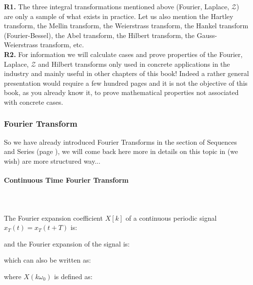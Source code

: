 	\begin{tcolorbox}[title=Remarks,arc=10pt,breakable,drop lifted shadow,
  skin=enhanced,
  skin first is subskin of={enhancedfirst}{arc=10pt,no shadow},
  skin middle is subskin of={enhancedmiddle}{arc=10pt,no shadow},
  skin last is subskin of={enhancedlast}{drop lifted shadow}]
	\textbf{R1.} The three integral transformations mentioned above (Fourier, Laplace, $\mathcal{Z}$) are only a sample of what exists in practice. Let us also mention the Hartley transform, the Mellin transform, the Weierstrass transform, the Hankel transform (Fourier-Bessel), the Abel transform, the Hilbert transform, the Gauss-Weierstrass transform, etc.\\
	
	\textbf{R2.} For information we will calculate cases and prove properties of the Fourier, Laplace, $\mathcal{Z}$ and Hilbert transforms only used in concrete applications in the industry and mainly useful in other chapters of this book! Indeed a rather general presentation would require a few hundred pages and it is not the objective of this book, as you already know it, to prove mathematical properties not associated with concrete cases.
	\end{tcolorbox} 
	
	\subsubsection{Fourier Transform} \label{fourier transform analysis}
	So we have already introduced Fourier Transforms in the section of Sequences and Series (page \pageref{fourier transform}), we will come back here more in details on this topic in (we wish) are more structured way...
	
	\paragraph{Continuous Time Fourier Transform}\mbox{}\\\\	
	The Fourier expansion coefficient $X[k]$ of a continuous periodic  signal $x_T(t)=x_T(t+T)$ is:
	
	and the Fourier expansion of the signal is:
	
	which can also be written as:
	
	where $X(k\omega_0)$ is defined as:
	
